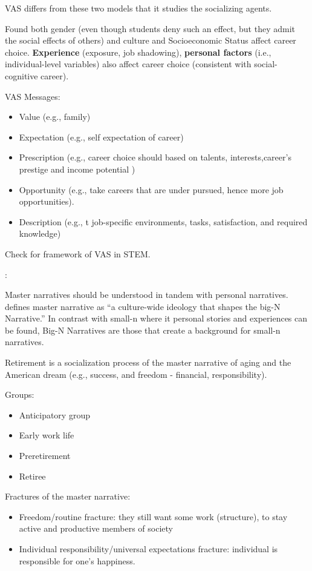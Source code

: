 \documentclass[
]{book}
\providecommand{\tightlist}{%
  \setlength{\itemsep}{0pt}\setlength{\parskip}{0pt}}
\begin{document}
VAS differs from these two models that it studies the socializing agents.

Found both gender (even though students deny such an effect, but they admit the social effects of others) and culture
and Socioeconomic Status affect career choice. \textbf{Experience} (exposure, job shadowing), \textbf{personal factors} (i.e.,
individual-level variables) also affect career choice (consistent with social-cognitive career).

VAS Messages:

\begin{itemize}
\tightlist
\item
  Value (e.g., family)
\item
  Expectation (e.g., self expectation of career)
\item
  Prescription (e.g., career choice should based on talents, interests,career's prestige and income potential )
\item
  Opportunity (e.g., take careers that are under pursued, hence more job opportunities).
\item
  Description (e.g., t job-specific environments, tasks, satisfaction, and required knowledge)
\end{itemize}

Check \citep[pp.107]{Myers_2010} for framework of VAS in STEM.

\citep{smith2012}:

Master narratives should be understood in tandem with personal narratives. \citep[pp.209]{tannen2008} defines master
narrative as ``a culture-wide ideology that shapes the big-N Narrative.'' In contrast with small-n where it personal
stories and experiences can be found, Big-N Narratives are those that create a background for small-n narratives.

Retirement is a socialization process of the master narrative of aging and the American dream (e.g., success, and
freedom - financial, responsibility).

Groups:

\begin{itemize}
\tightlist
\item
  Anticipatory group
\item
  Early work life
\item
  Preretirement
\item
  Retiree
\end{itemize}

Fractures of the master narrative:

\begin{itemize}
\tightlist
\item
  Freedom/routine fracture: they still want some work (structure), to stay active and productive members of society
\item
  Individual responsibility/universal expectations fracture: individual is responsible for one's happiness.
\end{itemize}
\end{document}
